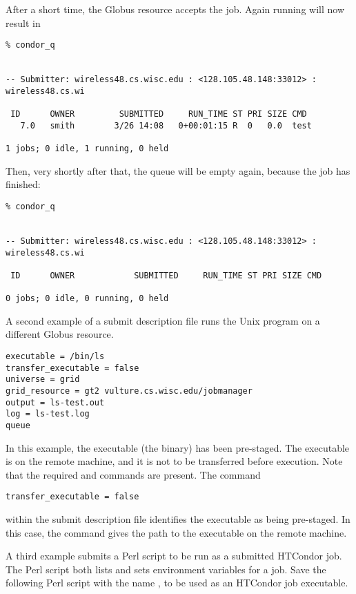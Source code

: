 After a short time, the Globus resource accepts the job.
Again running  will now result in

\footnotesize
\begin{verbatim}
% condor_q


-- Submitter: wireless48.cs.wisc.edu : <128.105.48.148:33012> : wireless48.cs.wi

 ID      OWNER         SUBMITTED     RUN_TIME ST PRI SIZE CMD
   7.0   smith        3/26 14:08   0+00:01:15 R  0   0.0  test

1 jobs; 0 idle, 1 running, 0 held
\end{verbatim}
\normalsize

Then, very shortly after that, the queue will be empty again,
because the job has finished:

\footnotesize
\begin{verbatim}
% condor_q


-- Submitter: wireless48.cs.wisc.edu : <128.105.48.148:33012> : wireless48.cs.wi

 ID      OWNER            SUBMITTED     RUN_TIME ST PRI SIZE CMD

0 jobs; 0 idle, 0 running, 0 held
\end{verbatim}
\normalsize


A second example of a submit description file runs the Unix 
program on a different Globus resource.

\footnotesize
\begin{verbatim}
executable = /bin/ls
transfer_executable = false
universe = grid
grid_resource = gt2 vulture.cs.wisc.edu/jobmanager
output = ls-test.out
log = ls-test.log
queue
\end{verbatim} 
\normalsize

In this example, the executable (the binary) has been pre-staged.
The executable is on the remote machine, and it is not to
be transferred before execution.
Note that the required 
 and 
commands are present.
The command
\begin{verbatim}
transfer_executable = false
\end{verbatim}
within the submit description file identifies the executable
as being pre-staged.
In this case, the 
command gives the path to the executable on the remote machine.

A third example submits a Perl script to be run as a submitted
HTCondor job.
The Perl script both lists and sets
environment variables for a job.
Save the following Perl script with the name ,
to be used as an HTCondor job executable.

